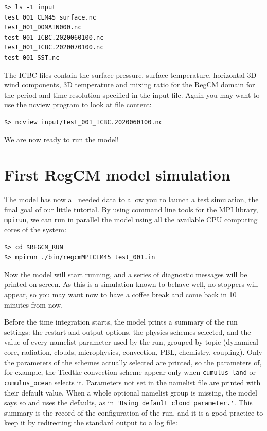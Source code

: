 \begin{Verbatim}
$> ls -1 input
test_001_CLM45_surface.nc
test_001_DOMAIN000.nc
test_001_ICBC.2020060100.nc
test_001_ICBC.2020070100.nc
test_001_SST.nc
\end{Verbatim}

The ICBC files contain the surface pressure, surface temperature, horizontal
3D wind components, 3D temperature and mixing ratio for the RegCM domain for the
period and time resolution specified in the input file.
Again you may want to use the ncview program to look at file content:

\begin{Verbatim}
$> ncview input/test_001_ICBC.2020060100.nc
\end{Verbatim}

We are now ready to run the model!

\section{First RegCM model simulation}

The model has now all needed data to allow you to launch a test simulation,
the final goal of our little tutorial. By using command line tools for the
MPI library, \verb=mpirun=, we can run in parallel the model using all the
available CPU computing cores of the system:

\begin{Verbatim}
$> cd $REGCM_RUN
$> mpirun ./bin/regcmMPICLM45 test_001.in
\end{Verbatim}

Now the model will start running, and a series of diagnostic messages will be
printed on screen. As this is a simulation known to behave well, no stoppers
will appear, so you may want now to have a coffee break and come back in 10
minutes from now.

Before the time integration starts, the model prints a summary of the run
settings: the restart and output options, the physics schemes selected, and
the value of every namelist parameter used by the run, grouped by topic
(dynamical core, radiation, clouds, microphysics, convection, PBL,
chemistry, coupling). Only the parameters of the schemes actually selected
are printed, so the parameters of, for example, the Tiedtke convection
scheme appear only when \verb=cumulus_land= or \verb=cumulus_ocean=
selects it. Parameters not set in the namelist file are printed with
their default value. When a whole optional namelist group is missing, the model says so and uses the defaults, as in
\verb='Using default cloud parameter.'=. This summary is the record of the
configuration of the run, and it is a good practice to keep it by
redirecting the standard output to a log file:

